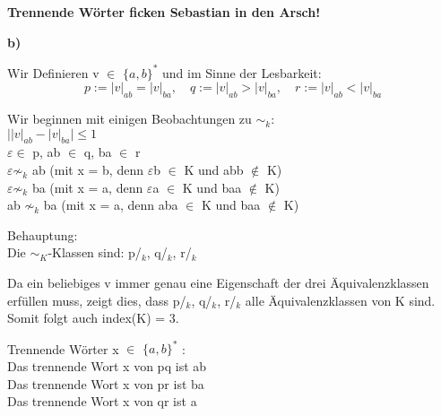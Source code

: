 \documentclass[a4paper,graphics,11pt]{article}
\begin{document}
\textbf{Trennende Wörter ficken Sebastian in den Arsch!}


\textbf{b)}


Wir Definieren v $\in$ $\lbrace a,b \rbrace^*$ und im Sinne der Lesbarkeit:\\
$$
	p := |v|_{ab} = |v|_{ba},\quad q := |v|_{ab} > |v|_{ba}, \quad r := |v|_{ab} < |v|_{ba}
$$

Wir beginnen mit einigen Beobachtungen zu $\sim_k$:\\
$\textbf{|}|v|_{ab} - |v|_{ba}\textbf{|} \leq 1$ \\
$\varepsilon \in$ p, ab $\in$ q, ba $\in$ r\\
$\varepsilon \not\sim_k$ ab (mit x = b, denn $\varepsilon$b $\in$ K und abb $\not\in$ K)\\
$\varepsilon \not\sim_k$ ba (mit x = a, denn $\varepsilon$a $\in$ K und baa $\not\in$ K)\\
ab $\not\sim_k$ ba (mit x = a, denn aba $\in$ K und baa $\not\in$ K)

Behauptung:\\
Die $\sim_K$-Klassen sind: p/$_k$, q/$_k$, r/$_k$

Da ein beliebiges v immer genau eine Eigenschaft der drei Äquivalenzklassen erfüllen muss, zeigt dies, dass p/$_k$, q/$_k$, r/$_k$ alle Äquivalenzklassen von K sind.\\
Somit folgt auch index(K) = 3.

Trennende Wörter x $\in$ $\lbrace a,b \rbrace^*$ :\\
Das trennende Wort x von pq ist ab\\
Das trennende Wort x von pr ist ba\\
Das trennende Wort x von qr ist a\\
\end{document}
